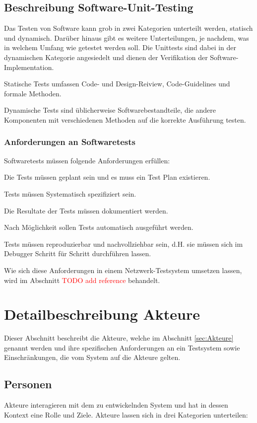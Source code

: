 \documentclass[
	ngerman,
	toc=listof, %
	toc=bibliography, %
	footnotes=multiple, %
	parskip=half, %
	numbers=noendperiod %
]{scrartcl}
\begin{document}
	\subsection{Beschreibung Software-Unit-Testing}
	Das Testen von Software kann grob in zwei Kategorien unterteilt werden, statisch und dynamisch. 
	Darüber hinaus gibt es weitere Unterteilungen, je nachdem, was in welchem Umfang wie getestet werden soll. Die Unittests sind dabei in der dynamischen Kategorie angesiedelt und dienen der Verifikation der Software-Implementation.

	Statische Tests umfassen Code- und Design-Reiview, Code-Guidelines und formale Methoden.

	Dynamische Tests sind üblicherweise Softwarebestandteile, die andere Komponenten mit verschiedenen Methoden auf die korrekte Ausführung testen. 

		\subsubsection{Anforderungen an Softwaretests}
		Softwaretests müssen folgende Anforderungen erfüllen:

		Die Tests müssen geplant sein und es muss ein Test Plan existieren.

		Tests müssen Systematisch spezifiziert sein.

		Die Resultate der Tests müssen dokumentiert werden.

		Nach Möglichkeit sollen Tests automatisch ausgeführt werden.

		Tests müssen reproduzierbar und nachvollziehbar sein, d.H. sie müssen sich im Debugger Schritt für Schritt durchführen lassen.
		
		Wie sich diese Anforderungen in einem Netzwerk-Testsystem umsetzen lassen, wird im Abschnitt \textcolor{red}{TODO add reference} behandelt.
	
\section{Detailbeschreibung Akteure}
Dieser Abschnitt beschreibt die Akteure, welche im Abschnitt \ref{sec:Akteure} genannt werden und ihre spezifischen Anforderungen an ein Testsystem sowie Einschränkungen, die vom System auf die Akteure gelten.
	
	\subsection{Personen}
	Akteure interagieren mit dem zu entwickelnden System und hat in dessen Kontext eine Rolle und Ziele.
	Akteure lassen sich in drei Kategorien unterteilen: 
		
\end{document}
